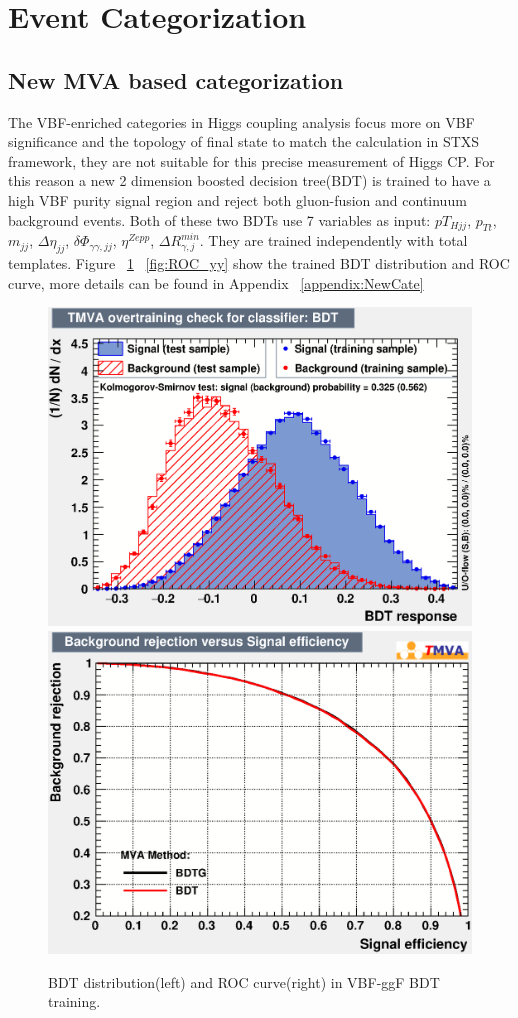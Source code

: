 \section{Event Categorization}
\label{sec:Category}

\subsection{New MVA based categorization}

The VBF-enriched categories in Higgs coupling analysis focus more on VBF significance and the topology of final state to match the calculation in STXS framework, they are not suitable for this precise measurement of Higgs CP. For this reason a new 2 dimension boosted decision tree(BDT) is trained to have a high VBF purity signal region and reject both gluon-fusion and continuum background events. Both of these two BDTs use 7 variables as input: $pT_{Hjj}$, $p_{Tt}$, $m_{jj}$, $\Delta\eta_{jj}$, $\delta\Phi_{\gamma\gamma, jj}$, $\eta^{Zepp}$, $\Delta R^{min}_{\gamma, j}$. They are trained independently with total templates. Figure ~\ref{fig:ROC_ggh} ~\ref{fig:ROC_yy} show the trained BDT distribution and ROC curve, more details can be found in Appendix ~\ref{appendix:NewCate}

\begin{figure}[bp]
  \centering
  \includegraphics[width=0.45\linewidth]{figure/BDT/Perf_ggh/overtrain_BDT.eps}
  \includegraphics[width=0.45\linewidth]{figure/BDT/Perf_ggh/rejBvsS.eps}
  \caption{BDT distribution(left) and ROC curve(right) in VBF-ggF BDT training.}
  \label{fig:ROC_ggh}
\end{figure}

